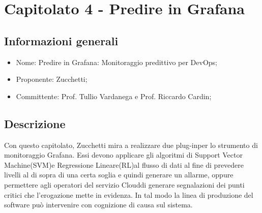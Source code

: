 \section{Capitolato 4 - Predire in Grafana}

\subsection{Informazioni generali}
\begin{itemize}
	\item Nome: Predire in Grafana\glo: Monitoraggio predittivo per DevOps\glo;
	\item Proponente: Zucchetti;
	\item Committente: Prof. Tullio Vardanega e Prof. Riccardo Cardin;
\end{itemize}

\subsection{Descrizione}
Con questo capitolato, Zucchetti mira a realizzare due plug-in\glosp per lo strumento di monitoraggio Grafana\glo. Essi devono applicare gli algoritmi di Support Vector Machine(SVM)\glosp e Regressione Lineare(RL)\glosp al flusso di dati al fine di prevedere livelli al di sopra di una certa soglia e quindi generare un allarme, oppure permettere agli operatori del servizio Cloud\glosp di generare segnalazioni dei punti critici che l’erogazione mette in evidenza. In tal modo la linea di produzione del software può intervenire con cognizione di causa sul sistema.

